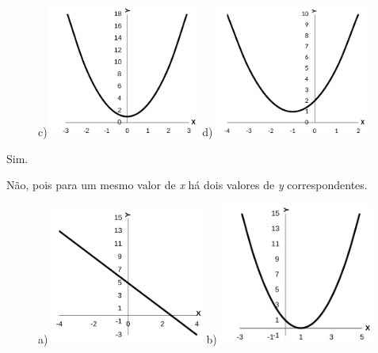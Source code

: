 \begin{respostas}{2}
\begin{figure}[H]
	c)\includegraphics[width=0.45\textwidth]{capitulos/funcao_do_primeiro_grau/media/image34.pdf} 
	d) \includegraphics[width=0.45\textwidth]{capitulos/funcao_do_primeiro_grau/media/image35.pdf}
\end{figure}

\ansitem{} Sim.

\ansitem{} Não, pois para um mesmo valor de \textit{x} há dois valores de \textit{y} correspondentes.

\begin{figure}[H]
	\ansitem{}

	a) \includegraphics[width=0.45\textwidth]{capitulos/funcao_do_primeiro_grau/media/image36.pdf} 
	b) \includegraphics[width=0.45\textwidth]{capitulos/funcao_do_primeiro_grau/media/image37.pdf}
\end{figure}


\end{respostas}
